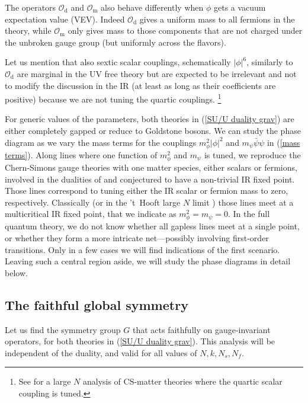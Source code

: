\documentclass[a4paper, 12pt]{article}
\numberwithin{equation}{section}
\newcommand{\cO}{\mathcal{O}}
\begin{document}
The operators $\cO_\text{d}$ and $\cO_\text{m}$ also behave differently when $\phi$ gets a vacuum expectation value (VEV). Indeed $\cO_\text{d}$ gives a uniform mass to all fermions in the theory, while $\cO_\text{m}$ only gives mass to those components that are not charged under the unbroken gauge group (but uniformly across the flavors).

Let us mention that also sextic scalar couplings, schematically $|\phi|^6$, similarly to $\cO_\text{d}$ are marginal in the UV free theory but are expected to be irrelevant and not to modify the discussion in the IR (at least as long as their coefficients are positive) because we are not tuning the quartic couplings.%
\footnote{See \cite{Aharony:toappear} for a large $N$ analysis of CS-matter theories where the quartic scalar coupling is tuned.}

For generic values of the parameters, both theories in (\ref{SU/U duality grav}) are either completely gapped or reduce to Goldstone bosons. We can study the phase diagram as we vary the mass terms for the couplings $m_\phi^2 |\phi|^2$ and $m_\psi \bar\psi \psi$ in (\ref{mass terms}). Along lines where one function of $m_\phi^2$ and $m_\psi$ is tuned, we reproduce the Chern-Simons gauge theories with one matter species, either scalars or fermions, involved in the dualities of \cite{Aharony:2015mjs, Hsin:2016blu} and conjectured to have a non-trivial IR fixed point. Those lines correspond to tuning either the IR scalar or fermion mass to zero, respectively. Classically (or in the 't~Hooft large $N$ limit \cite{Jain:2013gza}) those lines meet at a multicritical IR fixed point, that we indicate as $m_\phi^2 = m_\psi =0$. In the full quantum theory, we do not know whether all gapless lines meet at a single point, or whether they form a more intricate net---possibly involving first-order transitions. Only in a few cases we will find indications of the first scenario. Leaving such a central region aside, we will study the phase diagrams in detail below.







\subsection{The faithful global symmetry}
\label{sec: faithful symmetry}

Let us find the symmetry group $G$ that acts faithfully on gauge-invariant operators, for both theories in (\ref{SU/U duality grav}). This analysis will be independent of the duality, and valid for all values of $N,k,N_s, N_f$.
\end{document}
